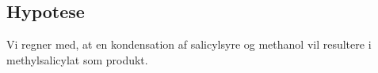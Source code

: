 \subsection*{Hypotese}
Vi regner med, at en kondensation af salicylsyre og methanol
vil resultere i methylsalicylat som produkt.
